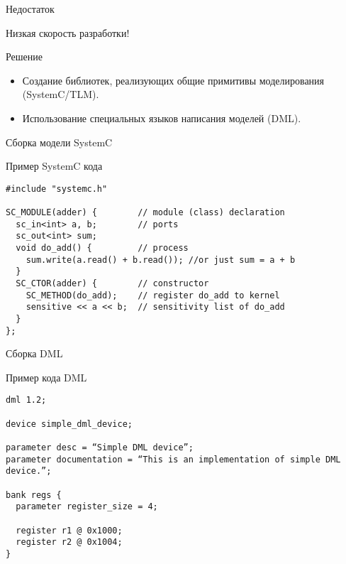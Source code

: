 \begin{frame}{Недостаток}

Низкая скорость разработки!

\end{frame}

\begin{frame}{Решение}

\begin{itemize}
  \item Создание библиотек, реализующих общие примитивы моделирования (SystemC/TLM).
  \item Использование специальных языков написания моделей (DML).
\end{itemize}

\end{frame}

\begin{frame}{Сборка модели SystemC}

\begin{figure}[htp]
    \centering
\end{figure}

\end{frame}

\begin{frame}[fragile]{Пример SystemC кода}

\begin{lstlisting}[basicstyle=\footnotesize]
#include "systemc.h"

SC_MODULE(adder) {        // module (class) declaration
  sc_in<int> a, b;        // ports
  sc_out<int> sum;
  void do_add() {         // process
    sum.write(a.read() + b.read()); //or just sum = a + b
  }
  SC_CTOR(adder) {        // constructor
    SC_METHOD(do_add);    // register do_add to kernel
    sensitive << a << b;  // sensitivity list of do_add
  }
};
\end{lstlisting}

\end{frame}

\begin{frame}{Сборка DML}

\begin{figure}[htp]
    \centering
\end{figure}

\end{frame}

\begin{frame}[fragile]{Пример кода DML}

\begin{lstlisting}
dml 1.2;

device simple_dml_device;

parameter desc = “Simple DML device”;
parameter documentation = “This is an implementation of simple DML device.”;

bank regs {
  parameter register_size = 4;

  register r1 @ 0x1000;
  register r2 @ 0x1004;
}
\end{lstlisting}

\end{frame}

